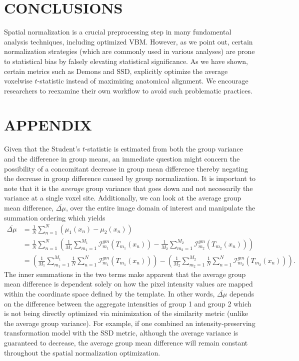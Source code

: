 \documentclass[]{spie}  %
\begin{document}
\section{CONCLUSIONS} 

Spatial normalization is a crucial preprocessing step in many fundamental 
analysis techniques, including optimized VBM.  However, as we point out,
certain normalization strategies (which are commonly used in various 
analyses) are prone to statistical bias by falsely elevating statistical 
significance.  As we have shown, certain metrics such as Demons and SSD,
explicitly optimize the average voxelwise $t$-statistic instead of maximizing
anatomical alignment.  We encourage researchers to reexamine their own
workflow to avoid such problematic practices.

 
\section*{APPENDIX} 

Given that the Student's $t$-statistic is estimated from both the group variance
and the difference in group means, an immediate question might concern
the possibility of a concomitant decrease in group mean difference thereby
negating the decrease in group difference caused by group normalization.  
It is important to 
note that it is the {\em average} group variance that goes down 
 and not necessarily the variance at a single voxel site.  Additionally, we can
look at the average group mean difference, $\overline{\Delta\mu}$, over the entire image domain of interest
and manipulate the summation ordering which yields
\begin{align}
  \overline{\Delta\mu}&=\frac{1}{N}\sum_{n=1}^N \left( \mu_1(x_n) - \mu_2(x_n) \right)  \\
  &=\frac{1}{N}\sum_{n=1}^N \left( \frac{1}{M_1}\sum_{m_1=1}^{M_1} \mathcal{I}^{gm}_{m_1}(T_{m_1}(x_n)) - \frac{1}{M_2}\sum_{m_2=1}^{M_2} \mathcal{I}^{gm}_{m_2}(T_{m_2}(x_n)) \right) \\
  &=\left( \frac{1}{M_1}\sum_{m_1=1}^{M_1} \frac{1}{N}\sum_{n=1}^N \mathcal{I}^{gm}_{m_1}\left(T_{m_1}(x_n)\right)\right)
   - \left(\frac{1}{M_2}\sum_{m_2=1}^{M_2} \frac{1}{N}\sum_{n=1}^N \mathcal{I}^{gm}_{m_2}\left(T_{m_2}(x_n)\right)\right).
\end{align}
The inner summations in the two terms make apparent that the average group mean 
difference is dependent solely on how the pixel intensity values are mapped 
within the coordinate space defined by the template. In other words,
$\overline{\Delta\mu}$ depends on the difference between the aggregate intensities
of group 1 and group 2 which is not being directly optimized via minimization of the 
similarity metric (unlike the average group variance). For example, if one combined 
an intensity-preserving transformation 
model with the SSD metric, although the average variance is guaranteed to decrease, the
average group mean difference will remain constant throughout the spatial normalization optimization.
\end{document}
